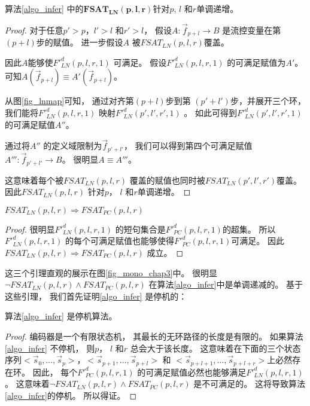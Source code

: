 \begin{lemma}\label{lemmalninc}
算法\ref{algo_infer} 中的$\mathbf{FSAT_{LN}(p,l,r)}$针对$p$, $l$ 和$r$单调递增。
\end{lemma}
\begin{proof}
对于任意$p'>p$，$l'>l$ 和$r'>l$，
假设$A:\vec{f}_{p+l}\to B$ 是流控变量在第$(p+l)$步的赋值。
进一步假设$A$ 被$FSAT_{LN}(p,l,r)$覆盖。

因此$A$能够使$F'^d_{LN}(p,l,r,1)$ 可满足。
假设$F'^d_{LN}(p,l,r,1)$ 的可满足赋值为$A'$。
可知$A(\vec{f}_{p+l})\equiv A'(\vec{f}_{p+l})$。

从图\ref{fig_lnmap}可知，
通过对齐第$(p+l)$步到第 $(p'+l')$步，并展开三个环，
我们能将$F'^d_{LN}(p,l,r,1)$ 映射$F'^d_{LN}(p',l',r',1)$ 。
如此可得到$F'^d_{LN}(p',l',r',1)$的可满足赋值$A''$。

通过将$A''$ 的定义域限制为$\vec{f}_{p'+l'}$，
我们可以得到第四个可满足赋值$A''':\vec{f}_{p'+l'}\to B$。
很明显$A\equiv A'''$。

这意味着每个被$FSAT_{LN}(p,l,r)$ 覆盖的赋值也同时被$FSAT_{LN}(p',l',r')$覆盖。
因此$FSAT_{LN}(p,l,r)$ 针对$p$， $l$ 和$r$单调递增。
\end{proof}


\begin{lemma}\label{lemmaln2pc}
$FSAT_{LN}(p,l,r)\Rightarrow FSAT_{PC}(p,l,r)$
\end{lemma}
\begin{proof}
很明显$F'^d_{LN}(p,l,r,1)$ 的短句集合是$F'^d_{PC}(p,l,r,1)$的超集。
所以$F'^d_{LN}(p,l,r,1)$ 的每个可满足赋值也能够使得$F'^d_{PC}(p,l,r,1)$可满足。
因此$FSAT_{LN}(p,l,r)\Rightarrow FSAT_{PC}(p,l,r)$ 成立。
\end{proof}

这三个引理直观的展示在图\ref{fig_mono_chap3}中。
很明显$\neg FSAT_{LN}(p,l,r)\wedge FSAT_{PC}(p,l,r)$ 在算法\ref{algo_infer}中是单调递减的。
基于这些引理，
我们首先证明\ref{algo_infer} 是停机的：

\begin{theorem}
算法\ref{algo_infer} 是停机算法。
\end{theorem}


\begin{proof}
编码器是一个有限状态机，
其最长的无环路径的长度是有限的。
如果算法\ref{algo_infer} 不停机，
则$p$， $l$ 和$r$ 总会大于该长度。
这意味着在下面的三个状态序列$<\vec{s}_{0},\dots,\vec{s}_{p}>$，$<\vec{s}_{p+1},\dots,\vec{s}_{p+l}>$ 和
$<\vec{s}_{p+l+1},\dots,\vec{s}_{p+l+r}>$上必然存在环。
因此，
每个$F'^d_{PC}(p,l,r,1)$ 的可满足赋值必然也能够满足$F'^d_{LN}(p,l,r,1)$。
这意味着$\neg FSAT_{LN}(p,l,r)\wedge FSAT_{PC}(p,l,r)$ 是不可满足的。
这将导致算法\ref{algo_infer}的停机。
所以得证。
\end{proof}


